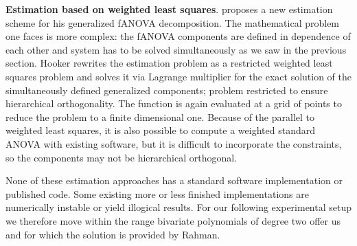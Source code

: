 \textbf{Estimation based on weighted least squares}. \cite{hooker2007} proposes a new estimation scheme for his generalized fANOVA decomposition. The mathematical problem one faces is more complex: the fANOVA components are defined in dependence of each other and system has to be solved simultaneously as we saw in the previous section.
Hooker rewrites the estimation problem as a restricted weighted least squares problem and solves it via Lagrange multiplier for the exact solution of the simultaneously defined generalized components; problem restricted to ensure hierarchical orthogonality.
The function is again evaluated at a grid of points to reduce the problem to a finite dimensional one. 
Because of the parallel to weighted least squares, it is also possible to compute a weighted standard ANOVA with existing software, but it is difficult to incorporate the constraints, so the components may not be hierarchical orthogonal.\par

None of these estimation approaches has a standard software implementation or published code. Some existing more or less finished implementations are numerically instable or yield illogical results. For our following experimental setup we therefore move within the range bivariate polynomials of degree two offer us and for which the solution is provided by Rahman.
